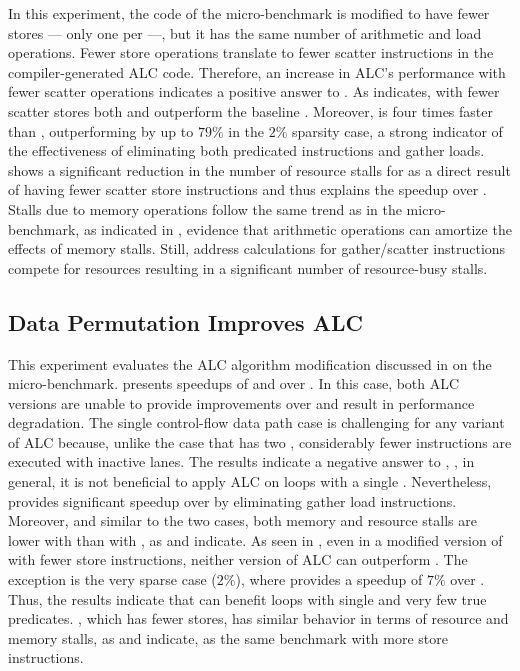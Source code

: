 In this experiment, the code of the \ifElseBench micro-benchmark is modified to have fewer stores --- only one per \cpath ---, but it has the same number of arithmetic and load operations.
Fewer store operations translate to fewer scatter instructions in the compiler-generated ALC code.
Therefore, an increase in ALC's performance with fewer scatter operations indicates a positive answer to .
As  indicates, with fewer scatter stores both \ALC and \ALCdp outperform the baseline \ifconv.
Moreover, \ALCdp is four times faster than \ALC, outperforming \ifconv by up to $79\%$ in the $2\%$ sparsity case, a strong indicator of the effectiveness of eliminating both predicated instructions and gather loads.
 shows a significant reduction in the number of resource stalls for \ALCdp as a direct result of having fewer scatter store instructions and thus explains the speedup over \ifconv.
Stalls due to memory operations follow the same trend as in the \ifElseBench micro-benchmark, as indicated in , evidence that arithmetic operations can amortize the effects of memory stalls.
Still, address calculations for gather/scatter instructions compete for resources resulting in a significant number of resource-busy stalls. 

\subsection{Data Permutation Improves ALC}
\label{sec:eval-single-if}

This experiment evaluates the ALC algorithm modification discussed in  on the \ifThenBench micro-benchmark.
 presents speedups of \ALC and \ALCdp over \ifconv.
In this case, both ALC versions are unable to provide improvements over \ifconv and result in performance degradation.
The single control-flow data path case is challenging for any variant of ALC because, unlike the \ifElseBench case that has two \cpaths, considerably fewer instructions are executed with inactive lanes.
The results indicate a negative answer to , \ie, in general, it is not beneficial to apply ALC on loops with a single \cpath.
Nevertheless, \ALCdp provides significant speedup over \ALC by eliminating gather load instructions.
Moreover, and similar to the two \cpath cases, both memory and resource stalls are lower with \ALCdp than with \ALC, as  and  indicate.
As seen in , even in a modified version of \ifThenBench with fewer store instructions, neither version of ALC can outperform \ifconv.
The exception is the very sparse case ($2\%$), where \ALCdp provides a speedup of $7\%$ over \ifconv.
Thus, the results indicate that \ALCdp can benefit loops with single \cpath and very few true predicates.
\ifThenBench, which has fewer stores, has similar behavior in terms of resource and memory stalls, as  and  indicate, as the same benchmark with more store instructions.


